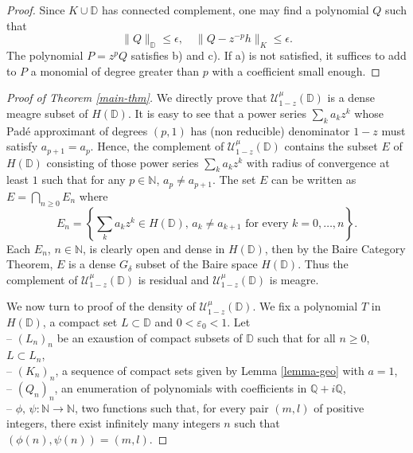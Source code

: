 \documentclass[12pt]{amsart}
\numberwithin{equation}{section}
\begin{document}
\begin{proof}
Since $K\cup{\mathbb D}$ has connected complement, one may find a polynomial $Q$ such that
$$\|Q\|_{\mathbb D}\leq\epsilon,\quad\|Q-z^{-p}h\|_{K}\leq\epsilon.$$
The polynomial $P=z^{p}Q$ satisfies b) and c).
If a) is not satisfied, it suffices to add to $P$ a monomial of degree greater than $p$ with a coefficient small enough.
\end{proof}
\begin{proof}[Proof of Theorem \ref{main-thm}]We directly prove that ${\mathcal U}_{1-z}^{\mu}({\mathbb D})$ is a dense meagre subset of $H({\mathbb D})$.  
It is easy to see that
a power series $\sum _k a_kz^k$ whose Pad\'e approximant of degrees $(p,1)$ has (non reducible) denominator $1-z$ must satisfy $a_{p+1}=a_p$.
Hence, the complement of ${\mathcal U}_{1-z}^{\mu}({\mathbb D})$ contains the subset $E$ of $H({\mathbb D})$ consisting of those power series $\sum _k a_kz^k$ with radius of convergence at least $1$ such that for any $p\in {\mathbb{N}}$, $a_p\neq a_{p+1}$. The set $E$ can be written as $E=\bigcap_{n\geq 0}E_n$ where
$$E_n=\left\{\sum _ka_kz^k \in H({\mathbb D}),\,a_k\neq a_{k+1}\text{ for every }k=0,\ldots ,n\right\}.$$
Each $E_n$, $n\in {\mathbb{N}}$, is clearly open and dense in $H({\mathbb D})$, then by the Baire Category Theorem, $E$ is a dense $G_{\delta}$ subset of the Baire space $H({\mathbb D})$. Thus the complement of ${\mathcal U}_{1-z}^{\mu}({\mathbb D})$ is residual and ${\mathcal U}_{1-z}^{\mu}({\mathbb D})$ is meagre.

We now turn to proof of the density of ${\mathcal U}_{1-z}^{\mu}({\mathbb D})$. We fix a polynomial $T$ in $H({\mathbb D})$, a compact set $L\subset {\mathbb D}$ and $0<\varepsilon _0<1$. Let \\
-- $\left(L_n\right)_n$ be an exaustion of compact subsets of ${\mathbb D}$ such that for all $n\geq 0$, $L\subset L_n$, \\
-- $\left(K_n\right)_n$, a sequence of compact sets given by Lemma \ref{lemma-geo} with $a=1$,\\
-- $\left(Q_n\right)_n$, an enumeration of polynomials with coefficients in ${\mathbb{Q}}+i{\mathbb{Q}}$,\\
-- $\phi,\,\psi:{\mathbb{N}}\rightarrow {\mathbb{N}}$, two functions such that, for every pair $(m,l)$ of positive integers, there exist infinitely many integers $n$ such that $(\phi(n),\psi(n))=(m,l)$.


\end{proof}
\end{document}

